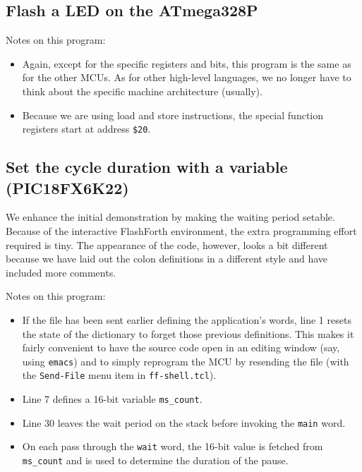 \documentclass[12pt,a4paper]{article}
\newcommand{\code}[2]{
 \hrulefill
 \scriptsize
 
 \hrulefill
 \vspace{2em}
 \normalsize
}
\begin{document}
\bigskip
\subsection{Flash a LED on the ATmega328P}
%

\noindent
\code{}{../avr8/flash-led-avr.txt}

\medskip\noindent
Notes on this program:
\begin{itemize}
\item Again, except for the specific registers and bits, 
  this program is the same as for the other MCUs.
  As for other high-level languages, we no longer have to think
  about the specific machine architecture (usually).
\item Because we are using load and store instructions, 
  the special function registers start at address \verb!$20!.
\end{itemize}


\newpage
\subsection{Set the cycle duration with a variable (PIC18FX6K22)}
%
We enhance the initial demonstration by making the waiting period setable.
Because of the interactive FlashForth environment, 
the extra programming effort required is tiny.
The appearance of the code, however, looks a bit different because we have 
laid out the colon definitions in a different style and have included 
more comments.

\bigskip\noindent
\code{}{../pic18/flash-led-var.txt}

\noindent
Notes on this program:
\begin{itemize}
 \item If the file has been sent earlier defining the application's words,
  line 1 resets the state of the dictionary to forget those previous definitions. 
  This makes it fairly convenient to have the source code open in an editing window
  (say, using \verb!emacs!) and to simply reprogram the MCU by resending the file
  (with the \verb!Send-File! menu item in \verb!ff-shell.tcl!). 
 \item Line 7 defines a 16-bit variable \verb!ms_count!.
 \item Line 30 leaves the wait period on the stack before invoking the \verb!main! word.
 \item On each pass through the \verb!wait! word, the 16-bit value is fetched from
  \verb!ms_count! and is used to determine the duration of the pause.
\end{itemize}
\end{document}
